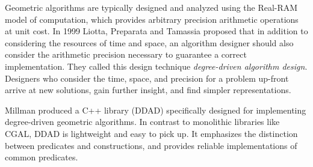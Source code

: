 Geometric algorithms are typically designed and analyzed using the Real-RAM
model of computation, which provides arbitrary precision arithmetic operations
at unit cost. In 1999 Liotta, Preparata and Tamassia proposed that in addition
to considering the resources of time and space, an algorithm designer should
also consider the arithmetic precision necessary to guarantee a correct
implementation. They called this design technique \emph{degree-driven algorithm
design}. Designers who consider the time, space, and precision for a problem
up-front arrive at new solutions, gain further insight, and find simpler
representations.

Millman produced a C++ library (DDAD) specifically designed for implementing
degree-driven geometric algorithms. In contrast to monolithic libraries
like CGAL, DDAD is lightweight and easy to pick up. It emphasizes the
distinction between predicates and constructions, and provides reliable
implementations of common predicates. 

% 
% 







% 
% 
% 




